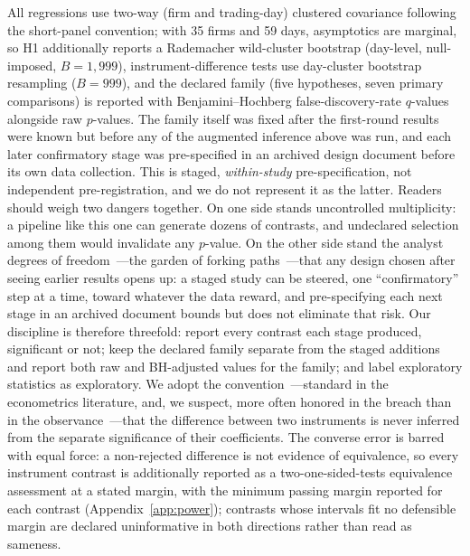 All regressions use two-way (firm and trading-day) clustered covariance following the short-panel convention; with 35 firms and 59 days, asymptotics are marginal, so H1 additionally reports a Rademacher wild-cluster bootstrap (day-level, null-imposed, $B=1{,}999$), instrument-difference tests use day-cluster bootstrap resampling ($B=999$), and the declared family (five hypotheses, seven primary comparisons) is reported with Benjamini--Hochberg false-discovery-rate $q$-values alongside raw $p$-values. The family itself was fixed after the first-round results were known but before any of the augmented inference above was run, and each later confirmatory stage was pre-specified in an archived design document before its own data collection. This is staged, \emph{within-study} pre-specification, not independent pre-registration, and we do not represent it as the latter. Readers should weigh two dangers together. On one side stands uncontrolled multiplicity: a pipeline like this one can generate dozens of contrasts, and undeclared selection among them would invalidate any $p$-value. On the other side stand the analyst degrees of freedom~---the garden of forking paths~---that any design chosen after seeing earlier results opens up: a staged study can be steered, one ``confirmatory'' step at a time, toward whatever the data reward, and pre-specifying each next stage in an archived document bounds but does not eliminate that risk. Our discipline is therefore threefold: report every contrast each stage produced, significant or not; keep the declared family separate from the staged additions and report both raw and BH-adjusted values for the family; and label exploratory statistics as exploratory. We adopt the convention~---standard in the econometrics literature, and, we suspect, more often honored in the breach than in the observance~---that the difference between two instruments is never inferred from the separate significance of their coefficients. The converse error is barred with equal force: a non-rejected difference is not evidence of equivalence, so every instrument contrast is additionally reported as a two-one-sided-tests equivalence assessment at a stated margin, with the minimum passing margin reported for each contrast (Appendix~\ref{app:power}); contrasts whose intervals fit no defensible margin are declared uninformative in both directions rather than read as sameness.
